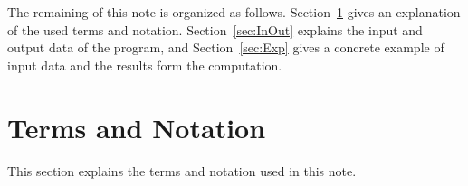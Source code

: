 \documentclass[11pt, titlepage, dvipdfmx, twoside]{article}
\begin{document}
\begin{itemize}
\begin{itemize}


\end{itemize}
\end{itemize}



The remaining of this note is organized as follows.
Section~\ref{sec:Pre} gives an explanation 
of the used terms and notation.
%
Section~\ref{sec:InOut} explains the 
input and output data of the program,
and Section~\ref{sec:Exp} gives a concrete
example of input data and the results form the computation.


\section{Terms and Notation}
\label{sec:Pre}
%
This section explains the terms and notation used in this note.
\end{document}
